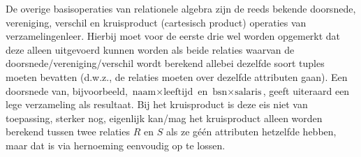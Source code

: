 De overige basisoperaties van relationele algebra zijn de reeds bekende doorsnede, vereniging, verschil en kruisproduct (cartesisch product) operaties van verzamelingenleer. Hierbij moet voor de eerste drie wel worden opgemerkt dat deze alleen uitgevoerd kunnen worden als beide relaties waarvan de doorsnede/vereniging/verschil wordt berekend allebei dezelfde soort tuples moeten bevatten (d.w.z., de relaties moeten over dezelfde attributen gaan). Een doorsnede van, bijvoorbeeld, $\text{naam}\times\text{leeftijd}$ en $\text{bsn}\times\text{salaris}$, geeft uiteraard een lege verzameling als resultaat. Bij het kruisproduct is deze eis niet van toepassing, sterker nog, eigenlijk kan/mag het kruisproduct alleen worden berekend tussen twee relaties $R$ en $S$ als ze g\'e\'en attributen hetzelfde hebben, maar dat is via hernoeming eenvoudig op te lossen. 

